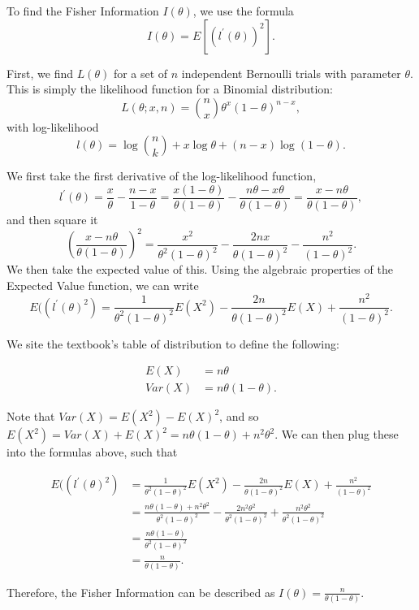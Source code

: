 \documentclass[]{article}
\begin{document}
To find the Fisher Information \(I(\theta)\), we use the formula \[
I(\theta) = E[(l^{\prime}(\theta))^2].
\]

First, we find \(L(\theta)\) for a set of \(n\) independent Bernoulli
trials with parameter \(\theta\). This is simply the likelihood function
for a Binomial distribution: \[
L(\theta; x, n) = {n\choose x} \theta^x (1-\theta)^{n-x}, 
\] with log-likelihood \[
l(\theta) = \log{n \choose k} + x\log{\theta} + (n - x) \log{(1 - \theta)}.
\]

We first take the first derivative of the log-likelihood function, \[
l^{\prime}(\theta) = \frac{x}{\theta} - \frac{n - x}{1- \theta} = 
\frac{x (1 - \theta)}{\theta(1 - \theta)} - \frac{n\theta - x\theta}{\theta (1 - \theta)} = \frac{x - n \theta}{\theta(1 - \theta)}, 
\] and then square it \[
\left(\frac{x - n \theta}{\theta(1 - \theta)}\right)^2 = \frac{x^2}{\theta^2 (1 - \theta)^2} - \frac{2nx}{\theta(1-\theta)^2} - \frac{n^2}{(1-\theta)^2}.
\] We then take the expected value of this. Using the algebraic
properties of the Expected Value function, we can write \[
E((l^{\prime}(\theta)^2) = \frac{1}{\theta^2(1 - \theta)^2}E(X^2) - \frac{2n}{\theta(1-\theta)^2}E(X) + \frac{n^2}{(1 - \theta)^2}.
\]

We site the textbook's table of distribution to define the following:

\begin{align*} 
E(X) &= n \theta \\
Var(X) &= n \theta (1 - \theta).
\end{align*}

Note that \(Var(X) = E(X^2) - E(X) ^2\), and so
\(E(X^2) = Var(X) + E(X)^2 = n\theta(1 - \theta) + n^2 \theta^2\). We
can then plug these into the formulas above, such that

\begin{align*}
E((l^{\prime}(\theta)^2) &= \frac{1}{\theta^2(1 - \theta)^2}E(X^2) - \frac{2n}{\theta(1-\theta)^2}E(X) + \frac{n^2}{(1 - \theta)^2} \\
&= \frac{n\theta(1 - \theta)  + n^2 \theta^2}{\theta^2(1 - \theta)^2} - 
          \frac{2n^2\theta^2}{\theta^2(1-\theta)^2} + 
          \frac{n^2 \theta^2}{\theta^2(1-\theta)^2} \\
&= \frac{n \theta ( 1- \theta)}{\theta^2 ( 1- \theta)^2} \\
&= \frac{n}{\theta(1-\theta)}.
\end{align*}

Therefore, the Fisher Information can be described as
\(I(\theta)=\frac{n}{\theta (1 - \theta)}\).
\end{document}
